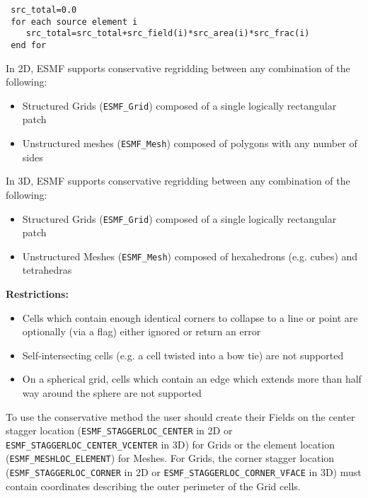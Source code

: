 \begin{verbatim}
 src_total=0.0
 for each source element i
    src_total=src_total+src_field(i)*src_area(i)*src_frac(i)
 end for
\end{verbatim}

\smallskip

 In 2D, ESMF supports conservative regridding between any combination of the following:
 \begin{itemize}
 \item Structured Grids ({\tt ESMF\_Grid}) composed of a single logically rectangular patch
 \item Unstructured meshes ({\tt ESMF\_Mesh}) composed of polygons with any number of sides
 \end{itemize}

\smallskip

 In 3D, ESMF supports conservative regridding between any combination of the following:
 \begin{itemize}
 \item Structured Grids ({\tt ESMF\_Grid}) composed of a single logically rectangular patch
 \item Unstructured Meshes ({\tt ESMF\_Mesh}) composed of hexahedrons (e.g. cubes) and tetrahedras
 \end{itemize}

\smallskip

{\bf Restrictions:}
 \begin{itemize}
 \item Cells which contain enough identical corners to collapse to a line or point are optionally (via a flag) either ignored or return an error
 \item Self-intersecting cells (e.g. a cell twisted into a bow tie) are not supported
 \item On a spherical grid, cells which contain an edge which extends more than half way around the sphere are not supported 
 \end{itemize}

\smallskip

 To use the conservative method the user should create their Fields on the center 
 stagger location ({\tt ESMF\_STAGGERLOC\_CENTER} in 2D or {\tt ESMF\_STAGGERLOC\_CENTER\_VCENTER} in 3D) for Grids  or the element location ({\tt ESMF\_MESHLOC\_ELEMENT}) for Meshes.
 For Grids, the corner stagger location ({\tt ESMF\_STAGGERLOC\_CORNER} in 2D or {\tt ESMF\_STAGGERLOC\_CORNER\_VFACE} in 3D) must contain coordinates describing the outer perimeter of the Grid cells. 

